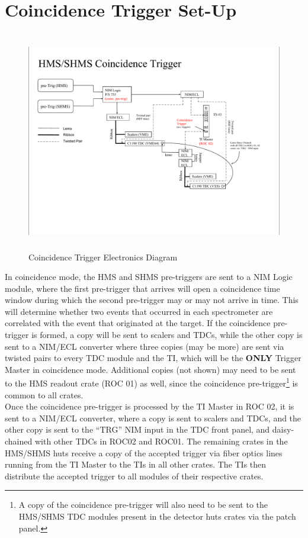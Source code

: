 \documentclass[11pt]{article}
\begin{document}
\section{Coincidence Trigger Set-Up}
\begin{figure}[h!]
  \centering
  \includegraphics[width=7.0in, height=3.8in]{Coincidence_Trigger.pdf}
  \caption{Coincidence Trigger Electronics Diagram}
  \label{fig:coin_trg}
\end{figure}
\indent In coincidence mode, the HMS and SHMS pre-triggers are sent to a NIM Logic module, where the first pre-trigger that arrives will open
a coincidence time window during which the second pre-trigger may or may not arrive in time. This will determine whether two events that occurred in
each spectrometer are correlated with the event that originated at the target. If the coincidence pre-trigger is formed, a copy will be sent to
scalers and TDCs, while the other copy is sent to a NIM/ECL converter where three copies (may be more) are sent via twisted pairs to every TDC module and the TI, which will be the \textbf{ONLY} Trigger Master in coincidence mode. Additional copies (not shown) may need to be sent to the HMS readout crate (ROC 01) as well, since the coincidence pre-trigger\footnote{A copy of the coincidence pre-trigger will also need to be sent to the
  HMS/SHMS TDC modules present in the detector huts crates via the patch panel.} is common to all crates. \\
\indent Once the coincidence pre-trigger is processed by the TI Master in ROC 02, it is sent to a NIM/ECL converter, where a copy is sent to scalers and TDCs, and the other copy is sent to the ``TRG'' NIM input in the TDC front panel, and daisy-chained with other TDCs in ROC02 and ROC01. The remaining crates in the HMS/SHMS huts receive a copy of the accepted trigger via fiber optics lines running from the TI Master to the TIs in all other crates. The TIs then distribute the accepted trigger to all modules of their respective crates. 
\newpage
\onecolumn


\end{document}
